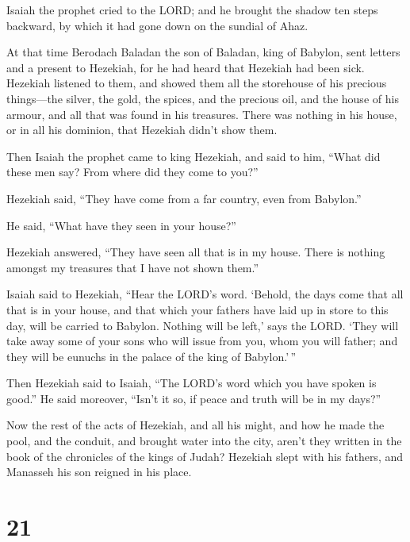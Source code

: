 Isaiah the prophet cried to the LORD; and he brought the
shadow ten steps backward, by which it had gone down on the sundial of
Ahaz.

 At that time Berodach Baladan the son of Baladan, king of
Babylon, sent letters and a present to Hezekiah, for he had heard that
Hezekiah had been sick.  Hezekiah listened to them, and
showed them all the storehouse of his precious things---the silver, the
gold, the spices, and the precious oil, and the house of his armour, and
all that was found in his treasures. There was nothing in his house, or
in all his dominion, that Hezekiah didn't show them.

 Then Isaiah the prophet came to king Hezekiah, and said to
him, ``What did these men say? From where did they come to you?''

Hezekiah said, ``They have come from a far country, even from Babylon.''

 He said, ``What have they seen in your house?''

Hezekiah answered, ``They have seen all that is in my house. There is
nothing amongst my treasures that I have not shown them.''

 Isaiah said to Hezekiah, ``Hear the LORD's word.
 `Behold, the days come that all that is in your house, and
that which your fathers have laid up in store to this day, will be
carried to Babylon. Nothing will be left,' says the LORD. 
`They will take away some of your sons who will issue from you, whom you
will father; and they will be eunuchs in the palace of the king of
Babylon.'\,''

 Then Hezekiah said to Isaiah, ``The LORD's word which you
have spoken is good.'' He said moreover, ``Isn't it so, if peace and
truth will be in my days?''

 Now the rest of the acts of Hezekiah, and all his might,
and how he made the pool, and the conduit, and brought water into the
city, aren't they written in the book of the chronicles of the kings of
Judah?  Hezekiah slept with his fathers, and Manasseh his
son reigned in his place.

\hypertarget{section-20}{%
\section{21}\label{section-20}}

